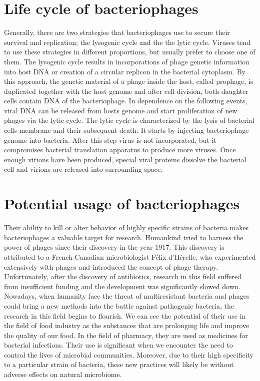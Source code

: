 \section{Life cycle of bacteriophages}
Generally, there are two strategies that bacteriophages use to secure their survival and replication; the lysogenic cycle and the the lytic cycle.
Viruses tend to use these strategies in different proportions, but usually prefer to choose one of them.
The lysogenic cycle results in incorporations of phage genetic information into host DNA or creation of a circular replicon in the bacterial cytoplasm.
By this approach, the genetic material of a phage inside the host, called prophage, is duplicated together with the host genome and after cell division, both daughter cells contain DNA of the bacteriophage.
In dependence on the following events, viral DNA can be released from hosts genome and start proliferation of new phages via the lytic cycle.
The lytic cycle is characterized by the lysis of bacterial cells membrane and their subsequent death.
It starts by injecting bacteriophage genome into bacteria.
After this step virus is not incorporated, but it compromises bacterial translation apparatus to produce more viruses.
Once enough virions have been produced, special viral proteins dissolve the bacterial cell and virions are released into surrounding space.

\section{Potential usage of bacteriophages}
Their ability to kill or alter behavior of highly specific strains of bacteria makes bacteriophages a valuable target for research.
Humankind tried to harness the power of phages since their discovery in the year 1917.
This discovery is attributed to a French-Canadian microbiologist Félix d'Hérelle, who experimented extensively with phages and introduced the concept of phage therapy\cite{phages_in_nature}.
Unfortunately, after the discovery of antibiotics, research in this field suffered from insufficient funding and the development was significantly slowed down.\\
Nowadays, when humanity face the threat of multiresistant bacteria and phages could bring a new methods into the battle against pathogenic bacteria, the research in this field begins to flourish.
We can see the potential of their use in the field of food industry as the substances that are prolonging life and improve the quality of our food. In the field of pharmacy, they are used as medicines for bacterial infections. Their use is significant when we encounter the need to control the lives of microbial communities.
Moreover, due to their high specificity to a particular strain of bacteria, these new practices will likely be without adverse effects on natural microbiome.

